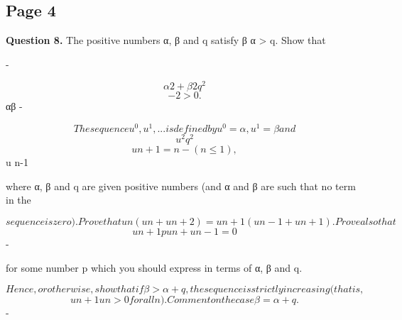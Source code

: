 \documentclass[12pt]{article}
\begin{document}
\subsection*{Page 4}
\begin{flushleft}
\omega\par
\bigskip\textbf{Question 8.} The positive numbers α, β and q satisfy β α > q. Show that\par
-\par
\[α2 + β2 q^2\]
\[- 2 > 0 .\]
αβ -\par
\[The sequence u^0, u^1, . . . is defined by u^0 = α, u^1 = β and\]
\[u^2 q^2\]
\[u n+1 = n - (n \leq 1),\]
u n-1\par
where α, β and q are given positive numbers (and α and β are such that no term in the\par
\[sequence is zero). Prove that u n (u n + u n+2) = u n+1(u n-1 + u n+1) . Prove also that\]
\[u n+1 pu n + u n-1 = 0\]
-\par
for some number p which you should express in terms of α, β and q.\par
\[Hence, or otherwise, show that if β > α + q, the sequence is strictly increasing (that is,\]
\[u n+1 u n > 0 for all n). Comment on the case β = α + q.\]
-\par
\end{flushleft}
\end{document}
